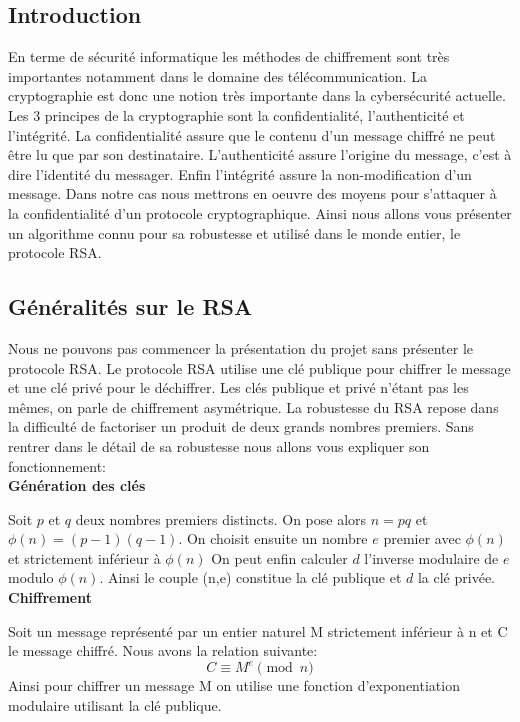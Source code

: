\subsection{Introduction}
En terme de sécurité informatique les méthodes de chiffrement sont très importantes notamment dans le domaine des télécommunication. La cryptographie est donc une notion très importante dans la cybersécurité actuelle. Les 3 principes de la cryptographie sont la confidentialité, l'authenticité et l'intégrité.
La confidentialité assure que le contenu d'un message chiffré ne peut être lu que par son destinataire.
L'authenticité assure l'origine du message, c'est à dire l'identité du messager.
Enfin l'intégrité assure la non-modification d'un message.
Dans notre cas nous mettrons en oeuvre des moyens pour s'attaquer à la confidentialité d'un protocole cryptographique. 
Ainsi nous allons vous présenter un algorithme connu pour sa robustesse et utilisé dans le monde entier, le protocole RSA.
\newpage
\subsection{Généralités sur le RSA}
Nous ne pouvons pas commencer la présentation du projet sans présenter le protocole RSA.
Le protocole RSA utilise une clé publique pour chiffrer le message et une clé privé pour le déchiffrer. Les clés publique et privé n'étant pas les mêmes, on parle de chiffrement asymétrique.
La robustesse du RSA repose dans la difficulté de factoriser un produit de deux grands nombres premiers.
Sans rentrer dans le détail de sa robustesse nous allons vous expliquer son fonctionnement:
\\

\textbf{Génération des clés}


Soit $p$ et $q$ deux nombres premiers distincts. On pose alors $n=pq$ et $\phi(n)=(p-1)(q-1)$.
On choisit ensuite un nombre $e$ premier avec $\phi(n)$ et strictement inférieur à $\phi(n)$
On peut enfin calculer $d$ l'inverse modulaire de $e$ modulo $\phi(n)$.
Ainsi le couple (n,e) constitue la clé publique et $d$ la clé privée.
\\

\textbf{Chiffrement}


Soit un message représenté par un entier naturel M strictement inférieur à n et C le message chiffré.
Nous avons la relation suivante:
\begin{equation}
\label{eq:chiffrement}

C \equiv M^e \pmod{n}

\end{equation}
Ainsi pour chiffrer un message M on utilise une fonction d'exponentiation modulaire utilisant la clé publique.
\\

